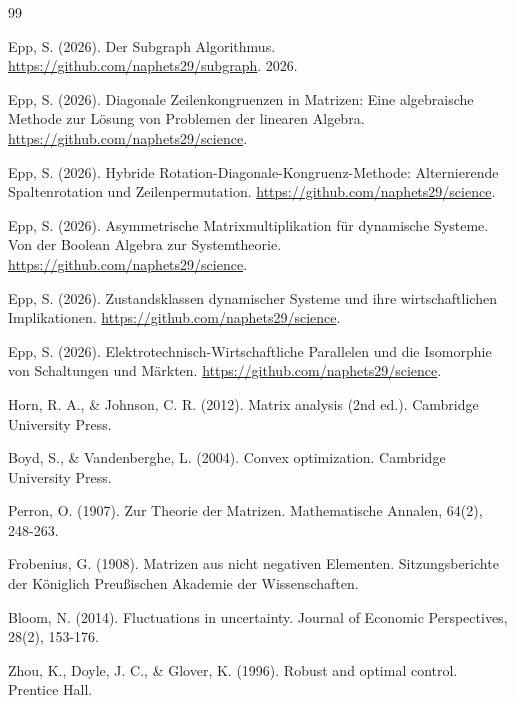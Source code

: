 \documentclass[a4paper,12pt]{article}
\theoremstyle{definition}
\begin{document}
\begin{thebibliography}{99}

Epp, S. (2026). Der Subgraph Algorithmus. \url{https://github.com/naphets29/subgraph}. 2026.

Epp, S. (2026). Diagonale Zeilenkongruenzen in Matrizen: Eine algebraische Methode zur Lösung von Problemen der linearen Algebra. \url{https://github.com/naphets29/science}.

Epp, S. (2026). Hybride Rotation-Diagonale-Kongruenz-Methode: Alternierende Spaltenrotation und Zeilenpermutation. \url{https://github.com/naphets29/science}.

Epp, S. (2026). Asymmetrische Matrixmultiplikation für dynamische Systeme. Von der Boolean Algebra zur Systemtheorie. \url{https://github.com/naphets29/science}.

Epp, S. (2026). Zustandsklassen dynamischer Systeme und ihre wirtschaftlichen Implikationen. \url{https://github.com/naphets29/science}.

Epp, S. (2026). Elektrotechnisch-Wirtschaftliche Parallelen und die Isomorphie von Schaltungen und Märkten. \url{https://github.com/naphets29/science}.

Horn, R. A., \& Johnson, C. R. (2012). Matrix analysis (2nd ed.). Cambridge University Press.

Boyd, S., \& Vandenberghe, L. (2004). Convex optimization. Cambridge University Press.

Perron, O. (1907). Zur Theorie der Matrizen. Mathematische Annalen, 64(2), 248-263.

Frobenius, G. (1908). Matrizen aus nicht negativen Elementen. Sitzungsberichte der Königlich Preußischen Akademie der Wissenschaften.

Bloom, N. (2014). Fluctuations in uncertainty. Journal of Economic Perspectives, 28(2), 153-176.

Zhou, K., Doyle, J. C., \& Glover, K. (1996). Robust and optimal control. Prentice Hall.

\end{thebibliography}
\end{document}
